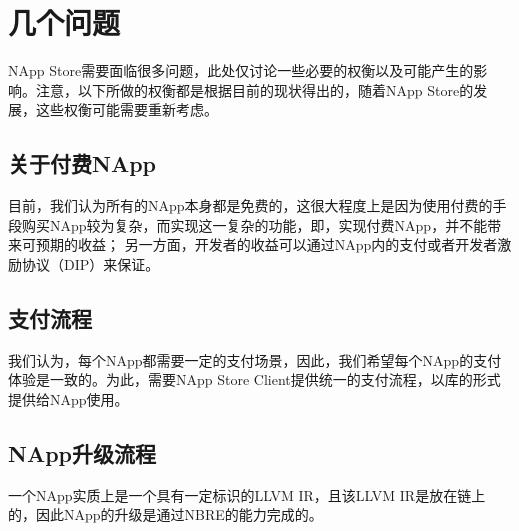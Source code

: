 \section{几个问题}
NApp Store需要面临很多问题，此处仅讨论一些必要的权衡以及可能产生的影响。注意，以下所做的权衡都是根据目前的现状得出的，随着NApp Store的发展，这些权衡可能需要重新考虑。
\subsection{关于付费NApp}
目前，我们认为所有的NApp本身都是免费的，这很大程度上是因为使用付费的手段购买NApp较为复杂，而实现这一复杂的功能，即，实现付费NApp，并不能带来可预期的收益；
另一方面，开发者的收益可以通过NApp内的支付或者开发者激励协议（DIP）来保证。
\subsection{支付流程}
我们认为，每个NApp都需要一定的支付场景，因此，我们希望每个NApp的支付体验是一致的。为此，需要NApp Store Client提供统一的支付流程，以库的形式提供给NApp使用。

\subsection{NApp升级流程}
一个NApp实质上是一个具有一定标识的LLVM IR，且该LLVM IR是放在链上的，因此NApp的升级是通过NBRE的能力完成的。
